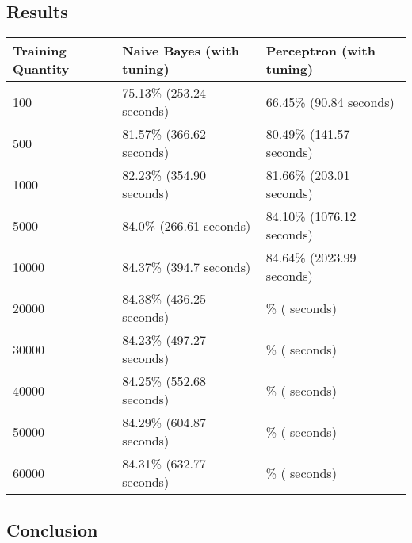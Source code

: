 \documentclass{article}
\theoremstyle{remark}
\begin{document}
     \subsection*{Results}
     \begin{table}[h!]
        \centering
        \begin{tabular}{l|l|l}
        Training Quantity & Naive Bayes (with tuning) & Perceptron (with tuning)  \\ \hline
        100               & 75.13\% (253.24 seconds)  & 66.45\% (90.84 seconds)   \\
        500               & 81.57\% (366.62 seconds)  & 80.49\% (141.57 seconds)  \\
        1000              & 82.23\% (354.90 seconds)  & 81.66\% (203.01 seconds)  \\
        5000              & 84.0\% (266.61 seconds)   & 84.10\% (1076.12 seconds) \\
        10000             & 84.37\% (394.7 seconds)   & 84.64\% (2023.99 seconds) \\
        20000             & 84.38\% (436.25 seconds)  & \% ( seconds)             \\
        30000             & 84.23\% (497.27 seconds)  & \% ( seconds)             \\
        40000             & 84.25\% (552.68 seconds)  & \% ( seconds)             \\
        50000             & 84.29\% (604.87 seconds)  & \% ( seconds)             \\
        60000             & 84.31\% (632.77 seconds)  & \% ( seconds)             \\
        \end{tabular}
     \end{table}
     \subsection*{Conclusion}



    
\end{document}
